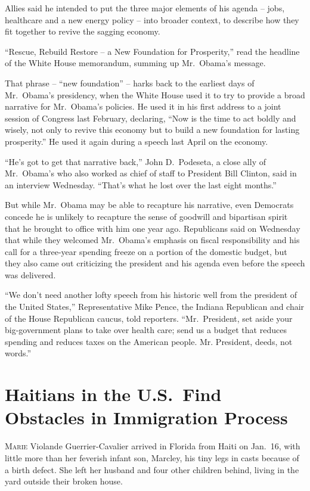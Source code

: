 ﻿\documentclass[12pt]{article}
\begin{document}
Allies said he intended to put the three major elements of his agenda – jobs, healthcare and a new
energy policy – into broader context, to describe how they fit together to revive the sagging
economy.

``Rescue, Rebuild Restore – a New Foundation for Prosperity,'' read the headline of the White House
memorandum, summing up Mr.~Obama's message.

That phrase – ``new foundation'' – harks back to the earliest days of Mr.~Obama's presidency, when
the White House used it to try to provide a broad narrative for Mr.~Obama's policies. He used it in
his first address to a joint session of Congress last February, declaring, ``Now is the time to act
boldly and wisely, not only to revive this economy but to build a new foundation for lasting
prosperity.'' He used it again during a speech last April on the economy.

``He's got to get that narrative back,'' John D.~Podeseta, a close ally of Mr.~Obama's who also
worked as chief of staff to President Bill Clinton, said in an interview Wednesday. ``That's what he
lost over the last eight months.''

But while Mr.~Obama may be able to recapture his narrative, even Democrats concede he is unlikely to
recapture the sense of goodwill and bipartisan spirit that he brought to office with him one year
ago. Republicans said on Wednesday that while they welcomed Mr.~Obama's emphasis on fiscal
responsibility and his call for a three-year spending freeze on a portion of the domestic budget,
but they also came out criticizing the president and his agenda even before the speech was
delivered.

``We don't need another lofty speech from his historic well from the president of the United
States,'' Representative Mike Pence, the Indiana Republican and chair of the House Republican
caucus, told reporters. ``Mr.~President, set aside your big-government plans to take over health
care; send us a budget that reduces spending and reduces taxes on the American people. Mr.
President, deeds, not words.''

\section{Haitians in the U.S.~Find Obstacles in Immigration Process}

\lettrine{M}{arie} Violande Guerrier-Cavalier arrived in Florida from Haiti
on Jan.~16, with little more than her feverish infant son, Marcley, his tiny legs in casts because
of a birth defect. She left her husband and four other children behind, living in the yard outside
their broken house.
\end{document}
